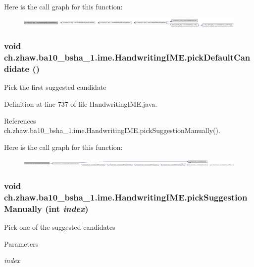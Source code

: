 Here is the call graph for this function:\nopagebreak
\begin{figure}[H]
\begin{center}
\leavevmode
\includegraphics[width=420pt]{classch_1_1zhaw_1_1ba10__bsha__1_1_1ime_1_1HandwritingIME_a372883c8da0f8e41f6acb0d169fc5b6e_cgraph}
\end{center}
\end{figure}
\hypertarget{classch_1_1zhaw_1_1ba10__bsha__1_1_1ime_1_1HandwritingIME_a6e2e375b97933b90f110199def80abfe}{
\subsubsection[{pickDefaultCandidate}]{\setlength{\rightskip}{0pt plus 5cm}void ch.zhaw.ba10\_\-bsha\_\-1.ime.HandwritingIME.pickDefaultCandidate ()}}
\label{classch_1_1zhaw_1_1ba10__bsha__1_1_1ime_1_1HandwritingIME_a6e2e375b97933b90f110199def80abfe}
Pick the first suggested candidate 

Definition at line 737 of file HandwritingIME.java.

References ch.zhaw.ba10\_\-bsha\_\-1.ime.HandwritingIME.pickSuggestionManually().

Here is the call graph for this function:\nopagebreak
\begin{figure}[H]
\begin{center}
\leavevmode
\includegraphics[width=420pt]{classch_1_1zhaw_1_1ba10__bsha__1_1_1ime_1_1HandwritingIME_a6e2e375b97933b90f110199def80abfe_cgraph}
\end{center}
\end{figure}
\hypertarget{classch_1_1zhaw_1_1ba10__bsha__1_1_1ime_1_1HandwritingIME_ada3cca347b6d9a39b3fb4d008d90dac8}{
\subsubsection[{pickSuggestionManually}]{\setlength{\rightskip}{0pt plus 5cm}void ch.zhaw.ba10\_\-bsha\_\-1.ime.HandwritingIME.pickSuggestionManually (int {\em index})}}
\label{classch_1_1zhaw_1_1ba10__bsha__1_1_1ime_1_1HandwritingIME_ada3cca347b6d9a39b3fb4d008d90dac8}
Pick one of the suggested candidates 
\begin{DoxyParams}{Parameters}
\item[{\em index}]\end{DoxyParams}


